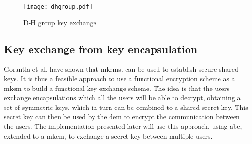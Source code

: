 \begin{figure}
\centering
\texttt{[image: dhgroup.pdf]}
\caption{D-H group key exchange}
\label{fig:dhgroup}
\end{figure}



\subsection{Key exchange from key encapsulation}\label{subsec:ke-kem}
Gorantla et al. \cite{kem-group-ke} have shown that m\Glspl{kem}, can be used to establish secure shared keys. It is thus a feasible approach to use a functional encryption scheme as a m\Gls{kem} to build a functional key exchange scheme. The idea is that the users exchange encapsulations which all the users will be able to decrypt, obtaining a set of symmetric keys, which in turn can be combined to a shared secret key. This secret key can then be used by the \gls{dem} to encrypt the communication between the users. The implementation presented later will use this approach, using \gls{abe}, extended to a m\Gls{kem}, to exchange a secret key between multiple users.







